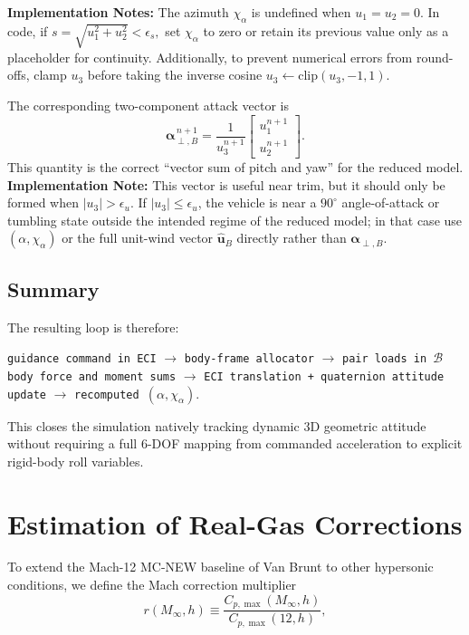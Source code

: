 \textbf{Implementation Notes:} The azimuth \(\chi_\alpha\) is undefined when \(u_1=u_2=0\). In code, if \( s=\sqrt{u_1^2+u_2^2}<\epsilon_s,\) set \(\chi_\alpha\) to zero or retain its previous value only as a placeholder for continuity. Additionally, to prevent numerical errors from round-offs, clamp \(u_3\) before taking the inverse cosine \(u_3\leftarrow\textrm{clip}(u_3,-1,1)\).

The corresponding two-component attack vector is
\begin{equation}
\boldsymbol\alpha_{\perp,B}^{\,n+1}
=
\frac{1}{u_3^{n+1}}
\begin{bmatrix}
u_1^{n+1}\\[2pt]u_2^{n+1}
\end{bmatrix}.
\end{equation}
This quantity is the correct ``vector sum of pitch and yaw'' for the reduced model.
\textbf{Implementation Note:} This vector is useful near trim, but it should only be formed when \(|u_3|>\epsilon_u\). If \(|u_3|\le \epsilon_u\), the vehicle is near a \(90^\circ\) angle-of-attack or tumbling state outside the intended regime of the reduced model; in that case use \((\alpha,\chi_\alpha)\) or the full unit-wind vector \(\hat{\mathbf u}_B\) directly rather than \(\boldsymbol\alpha_{\perp,B}\).

\subsection{Summary}
The resulting loop is therefore:
\begin{center}
\texttt{guidance command in ECI}
\(\to\)
\texttt{body-frame allocator}
\(\to\)
\texttt{pair loads in \(\mathcal B\)}
\\[2pt]
\texttt{body force and moment sums}
\(\to\)
\texttt{ECI translation + quaternion attitude update}
\(\to\)
\texttt{recomputed \((\alpha,\chi_\alpha)\)}.
\end{center}
This closes the simulation natively tracking dynamic 3D geometric attitude without requiring a full 6-DOF mapping from commanded acceleration to explicit rigid-body roll variables.



\clearpage
\appendix
\section{Estimation of Real-Gas Corrections}\label{app:realgas}

To extend the Mach-12 MC-NEW baseline of Van Brunt to other hypersonic conditions, we define the Mach correction multiplier
\begin{equation}
r(M_\infty,h)\equiv \frac{C_{p,\max}(M_\infty,h)}{C_{p,\max}(12,h)}, \label{eq:rg_mach_multiplier}
\end{equation}


